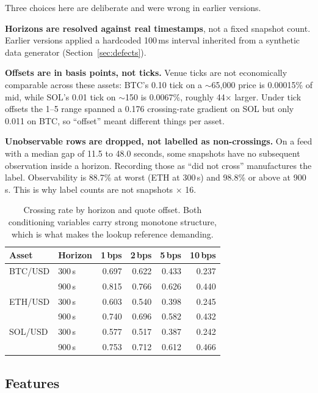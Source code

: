 \documentclass[11pt]{article}
\begin{document}
Three choices here are deliberate and were wrong in earlier versions.

\textbf{Horizons are resolved against real timestamps}, not a fixed snapshot
count. Earlier versions applied a hardcoded 100\,ms interval inherited from a
synthetic data generator (Section~\ref{sec:defects}).

\textbf{Offsets are in basis points, not ticks.} Venue ticks are not
economically comparable across these assets: BTC's 0.10 tick on a
$\sim$65{,}000 price is 0.00015\% of mid, while SOL's 0.01 tick on
$\sim$150 is 0.0067\%, roughly 44$\times$ larger. Under tick offsets the 1--5
range spanned a 0.176 crossing-rate gradient on SOL but only 0.011 on BTC, so
``offset'' meant different things per asset.

\textbf{Unobservable rows are dropped, not labelled as non-crossings.} On a feed
with a median gap of 11.5 to 48.0 seconds, some snapshots have no subsequent
observation inside a horizon. Recording those as ``did not cross'' manufactures
the label. Observability is 88.7\% at worst (ETH at 300\,s) and 98.8\% or above
at 900\,s. This is why label counts are not snapshots $\times$ 16.

\begin{table}[ht]
\centering
\caption{Crossing rate by horizon and quote offset. Both conditioning variables
carry strong monotone structure, which is what makes the lookup reference
demanding.}
\label{tab:marginals}
\begin{tabular}{llrrrr}
\toprule
Asset & Horizon & 1\,bps & 2\,bps & 5\,bps & 10\,bps \\
\midrule
BTC/USD & 300\,s & 0.697 & 0.622 & 0.433 & 0.237 \\
        & 900\,s & 0.815 & 0.766 & 0.626 & 0.440 \\
ETH/USD & 300\,s & 0.603 & 0.540 & 0.398 & 0.245 \\
        & 900\,s & 0.740 & 0.696 & 0.582 & 0.432 \\
SOL/USD & 300\,s & 0.577 & 0.517 & 0.387 & 0.242 \\
        & 900\,s & 0.753 & 0.712 & 0.612 & 0.466 \\
\bottomrule
\end{tabular}
\end{table}

\subsection{Features}
\end{document}
